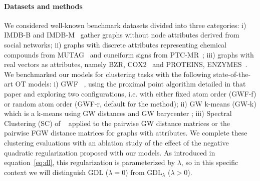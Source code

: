 \documentclass{article}
\def\eqref#1{equation~\ref{#1}}
\begin{document}
	\paragraph{Datasets and methods} We considered well-known benchmark datasets divided into three categories: i) IMDB-B and IMDB-M~\citep{yanardag-deep-2015} gather graphs without node attributes derived from social networks; ii) graphs with discrete attributes representing chemical compounds from MUTAG~\citep{debnath1991structure} and cuneiform signs from PTC-MR~\citep{krichene2015efficient}; iii) graphs with real vectors as attributes, namely  BZR, COX2~\citep{sutherland2003spline}
	and PROTEINS, ENZYMES~\citep{borgwardt2005shortest}. We benchmarked our models for clustering tasks with the following state-of-the-art OT models: 
	i) GWF ~\citep{xu_gromov-wasserstein_2019}, using the proximal point algorithm  detailed in that paper and exploring two configurations, i.e. with either fixed atom order (GWF-f) or random atom order (GWF-r, default for the method); ii) GW k-means (GW-k)  which is a k-means using GW distances and GW barycenter \citep{peyre2016gromov};
	iii) Spectral Clustering (SC) of ~\citep{shi2000normalized,stella2003multiclass} applied to the pairwise GW distance matrices or the pairwise FGW distance matrices for graphs with attributes. We complete these clustering evaluations with an ablation study of the effect of the negative quadratic regularization proposed with our models. As introduced in \eqref{eq:dl}, this regularization is parameterized by $\lambda$, so in this specific context we will distinguish GDL ($\lambda=0$) from $\text{GDL}_{\lambda}$ ($\lambda>0$).
	
\end{document}
